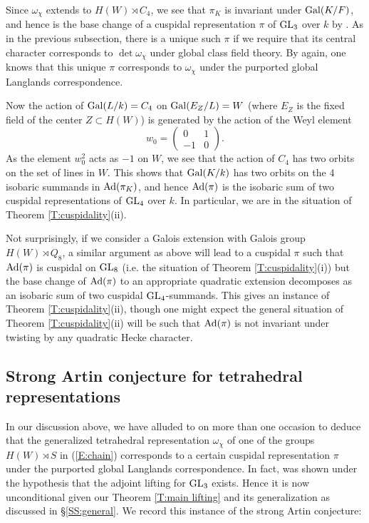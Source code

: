 \documentclass[11pt]{amsart}
\theoremstyle{plain}
\numberwithin{equation}{section}
\def\GL{{\rm GL}}
\begin{document}
 
 
  Since $\omega_{\chi}$ extends to $H(W) \rtimes C_4$, we see that $\pi_K$ is invariant under ${\rm Gal}(K/F)$, and hence is the base change of a cuspidal representation $\pi$ of $\GL_3$ over $k$ by \cite{AC}. As in the previous subsection, there is a unique such $\pi$ if we require that its central character corresponds to $\det \omega_{\chi}$ under global class field theory.  
By  \cite[\S 5, Prop. 2]{L2} again, one knows that this unique $\pi$ corresponds to $\omega_{\chi}$ under the purported global Langlands correspondence.
  \vskip 5pt
  
   Now the action of ${\rm Gal}(L/k) = C_4$ on ${\rm Gal}(E_Z/L) = W$ (where $E_Z$ is the fixed field of the center $Z \subset H(W)$) is generated by the action of the Weyl element 
 \[ w_0 = \left( \begin{array}{cc}
0 & 1 \\
-1 & 0 \end{array} \right). \]
As the element $w_0^2$ acts as $-1$ on $W$, we see that the action of $C_4$ has two orbits on  the set of lines in $W$.  This shows that ${\rm Gal}(K/k)$ has two orbits on the 4 isobaric summands in ${\rm Ad}(\pi_K)$, and hence
 ${\rm Ad}(\pi)$ is the isobaric sum of two cuspidal representations of $\GL_4$ over $k$. In particular, we are in the situation of Theorem \ref{T:cuspidality}(ii).
\vskip 5pt

Not surprisingly, if we consider a Galois extension with Galois group $H(W) \rtimes Q_8$, a similar argument as above  will lead to a cuspidal $\pi$ such that ${\rm Ad}(\pi)$ is cuspidal on $\GL_8$ (i.e. the situation of Theorem \ref{T:cuspidality}(i))  but the base change of ${\rm Ad}(\pi)$ to an appropriate   quadratic extension decomposes as an isobaric sum of two cuspidal $\GL_4$-summands. This gives an instance  of Theorem \ref{T:cuspidality}(ii), though one might expect the general situation of Theorem \ref{T:cuspidality}(ii) will be such that ${\rm Ad}(\pi)$ is not invariant under twisting by any quadratic Hecke character.
 
  \vskip 5pt
  
   \subsection{\bf Strong Artin conjecture for tetrahedral representations} In our discussion above, we have alluded to \cite[\S 5, Prop. 2]{L2} on more than one occasion to deduce that the generalized tetrahedral representation $\omega_{\chi}$ of one of the groups $H(W) \rtimes S$ in (\ref{E:chain}) corresponds to a certain cuspidal representation $\pi$ under the purported global Langlands correspondence. 
   In fact, \cite[\S 5, Prop. 2]{L2} was shown under the hypothesis that the adjoint lifting for $\GL_3$ exists. Hence it is now unconditional given our Theorem \ref{T:main lifting} and its generalization as discussed in \S \ref{SS:general}. We record this instance of the strong Artin conjecture:
   \vskip 5pt
   
\end{document}
